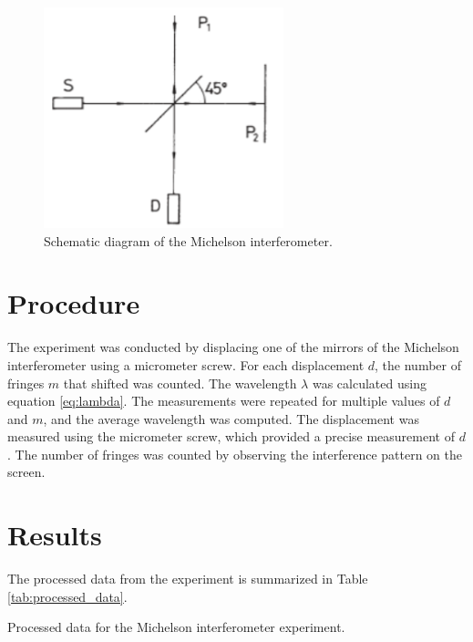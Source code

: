 \documentclass[journal]{IEEEtran}
\begin{document}
\begin{figure}[H]
    \centering
    \includegraphics[width=0.6\linewidth]{../IMAGES/diagram.png}
    \caption{Schematic diagram of the Michelson interferometer.}
    \label{fig:diagram}
\end{figure}

\section*{Procedure}
The experiment was conducted by displacing one of the mirrors of the Michelson interferometer using a micrometer screw. For each displacement \( d \), the number of fringes \( m \) that shifted was counted. The wavelength \( \lambda \) was calculated using equation \ref{eq:lambda}.
The measurements were repeated for multiple values of \( d \) and \( m \), and the average wavelength was computed. The displacement was measured using the micrometer screw, which provided a precise measurement of \( d \). The number of fringes was counted by observing the interference pattern on the screen.


\section{Results}
The processed data from the experiment is summarized in Table \ref{tab:processed_data}.

\begin{table}[H]
    \centering
    \caption{Processed data for the Michelson interferometer experiment.}
    \label{tab:processed_data}
\end{table}
\end{document}
